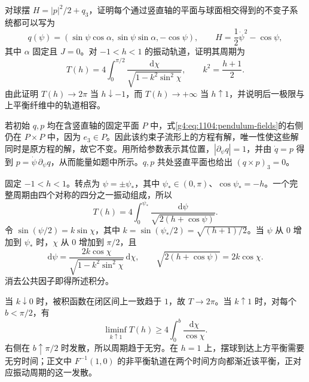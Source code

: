 \begin{exercise}\label{g4:ex:1104:pendulum-period-limit}
	对球摆 \(H=|p|^2/2+q_3\)，证明每个通过竖直轴的平面与球面相交得到的不变子系统都可以写为
	\[
		q(\psi)=(\sin\psi\cos\alpha,\sin\psi\sin\alpha,-\cos\psi),
		\qquad H=\frac12\dot\psi^2-\cos\psi,
	\]
	其中 \(\alpha\) 固定且 \(J=0\)。对 \(-1<h<1\) 的振动轨道，证明其周期为
	\[
		T(h)=4\int_0^{\pi/2}\frac{\mathrm{d}\chi}{\sqrt{1-k^2\sin^2\chi}},
		\qquad k^2=\frac{h+1}{2}.
	\]
	由此证明 \(T(h)\to2\pi\) 当 \(h\downarrow-1\)，而 \(T(h)\to+\infty\) 当 \(h\uparrow1\)，并说明后一极限与上平衡纤维中的轨道相容。
\end{exercise}
\begin{solution}
	若初始 \(q,p\) 均在含竖直轴的固定平面 \(P\) 中，式\eqref{g4:eq:1104:pendulum-fields}的右侧仍在 \(P\times P\) 中，因为 \(e_3\in P\)。因此该约束子流形上的方程有解，唯一性使这些解同时是原方程的解，故它不变。用所给参数表示其位置，\(|\partial_\psi q|=1\)，并由 \(\dot q=p\) 得到 \(p=\dot\psi\,\partial_\psi q\)，从而能量如题中所示。\(q,p\) 共处竖直平面也给出 \((q\times p)_3=0\)。

	固定 \(-1<h<1\)。转点为 \(\psi=\pm\psi_*\)，其中 \(\psi_*\in(0,\pi)\)、\(\cos\psi_*=-h\)。一个完整周期由四个对称的四分之一振动组成，所以
	\[
		T(h)=4\int_0^{\psi_*}\frac{\mathrm{d}\psi}{\sqrt{2(h+\cos\psi)}}.
	\]
	令 \(\sin(\psi/2)=k\sin\chi\)，其中 \(k=\sin(\psi_*/2)=\sqrt{(h+1)/2}\)。当 \(\psi\) 从 \(0\) 增加到 \(\psi_*\) 时，\(\chi\) 从 \(0\) 增加到 \(\pi/2\)，且
	\[
		\mathrm{d}\psi=\frac{2k\cos\chi}{\sqrt{1-k^2\sin^2\chi}}\,\mathrm{d}\chi,
		\qquad \sqrt{2(h+\cos\psi)}=2k\cos\chi.
	\]
	消去公共因子即得所述积分。

	当 \(k\downarrow0\) 时，被积函数在闭区间上一致趋于 \(1\)，故 \(T\to2\pi\)。当 \(k\uparrow1\) 时，对每个 \(b<\pi/2\)，有
	\[
		\liminf_{k\uparrow1}T(h)
		\ge4\int_0^b\frac{\mathrm{d}\chi}{\cos\chi}.
	\]
	右侧在 \(b\uparrow\pi/2\) 时发散，所以周期趋于无穷。在 \(h=1\) 上，摆球到达上方平衡需要无穷时间；正文中 \(F^{-1}(1,0)\) 的非平衡轨道在两个时间方向都渐近该平衡，正对应振动周期的这一发散。
\end{solution}
